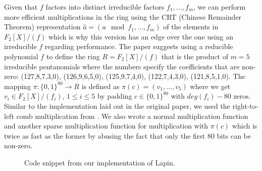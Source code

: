 \documentclass[11pt,a4paper]{article}
\begin{document}
Given that $f$ factors into distinct irreducible factors $f_1,\dots ,f_m$, we can perform more efficient multiplications in the ring using the CRT (Chinese Remainder Theorem) representation $\hat{a} = (a \mod f_1, \dots ,f_m)$ of the elements in $F_2[X] / (f)$ which is why this version has an edge over the one using an irreducible $f$ regarding performance. 
The paper suggests using a reducible polynomial $f$ to define the ring $R = F_2[X] / (f)$ that is the product of $m = 5$ irreducible pentanomials where the numbers specify the coefficients that are non-zero: (127,8,7,3,0), (126,9,6,5,0), (125,9,7,4,0), (122,7,4,3,0), (121,8,5,1,0). 
The mapping $\pi: \{0, 1\}^{80} \rightarrow R$ is defined as $\pi(c) = (v_1,\dots, v_5)$ where we get $v_i \in F_2[X] / (f_i)$, $1 \leq i \leq 5$ by  padding $c \in \{0,1\}^{80}$ with $deg(f_i) - 80$ zeros.
Similar to the implementation laid out in the original paper, we used the right-to-left comb multiplication from \cite{hankerson}. We also wrote a normal multiplication function and another sparse multiplication function for multiplication with $\pi(c)$ which is twice as fast as the former by abusing the fact that only the first 80 bits can be non-zero.

\begin{figure}[h]
	\caption{Code snippet from our implementation of Lapin. }
	\label{auth_code1}
\end{figure}

\newpage
{}


\end{document}
